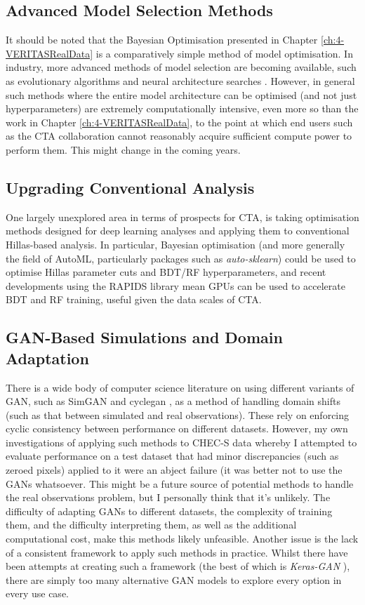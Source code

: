 \subsection{Advanced Model Selection Methods}

It should be noted that the Bayesian Optimisation presented in Chapter \ref{ch:4-VERITASRealData} is a comparatively simple method of model optimisation. In industry, more advanced methods of model selection are becoming available, such as evolutionary algorithms \cite{evodeep} and neural architecture searches \cite{neural}. However, in general such methods where the entire model architecture can be optimised (and not just hyperparameters) are extremely computationally intensive, even more so than the work in Chapter \ref{ch:4-VERITASRealData}, to the point at which end users such as the CTA collaboration cannot reasonably acquire sufficient compute power to perform them. This might change in the coming years.

\subsection{Upgrading Conventional Analysis}
One largely unexplored area in terms of prospects for CTA, is taking optimisation methods designed for deep learning analyses and applying them to conventional Hillas-based analysis. In particular, Bayesian optimisation (and more generally the field of AutoML, particularly packages such as \textit{auto-sklearn}\cite{autosklearn}) could be used to optimise Hillas parameter cuts and BDT/RF hyperparameters, and recent developments using the RAPIDS \cite{rapids} library mean GPUs can be used to accelerate BDT and RF training, useful given the data scales of CTA.


\subsection{GAN-Based Simulations and Domain Adaptation}
There is a wide body of computer science literature on using different variants of GAN, such as SimGAN \cite{simgan} and cyclegan \cite{cyclegan}, as a method of handling domain shifts (such as that between simulated and real observations). These rely on enforcing cyclic consistency between performance on different datasets. However, my own investigations of applying such methods to CHEC-S data whereby I attempted to evaluate performance on a test dataset that had minor discrepancies (such as zeroed pixels) applied to it were an abject failure (it was better not to use the GANs whatsoever. This might be a future source of potential methods to handle the real observations problem, but I personally think that it's unlikely. The difficulty of adapting GANs to different datasets, the complexity of training them, and the difficulty interpreting them, as well as the additional computational cost, make this methods likely unfeasible. Another issue is the lack of a consistent framework to apply such methods in practice. Whilst there have been attempts at creating such a framework (the best of which is \textit{Keras-GAN} \cite{kerasgan}), there are simply too many alternative GAN models to explore every option in every use case. 

